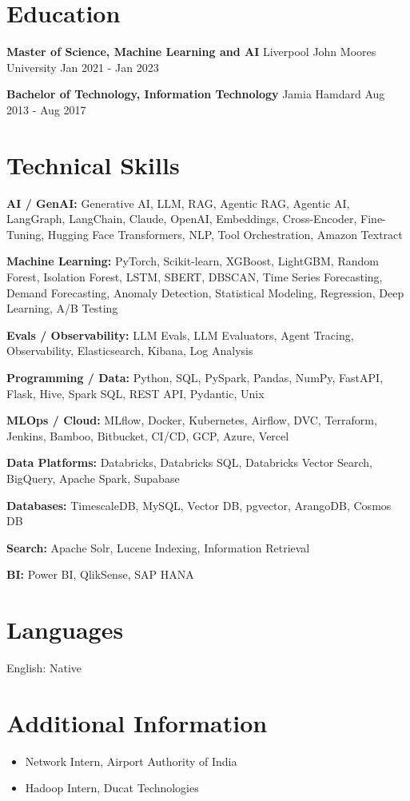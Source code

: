 \documentclass[10pt,a4paper]{article}
\begin{document}
\section{Education}
\textbf{Master of Science, Machine Learning and AI} \textbar{} Liverpool John Moores University \hfill Jan 2021 - Jan 2023\par
\textbf{Bachelor of Technology, Information Technology} \textbar{} Jamia Hamdard \hfill Aug 2013 - Aug 2017\par

\section{Technical Skills}
\textbf{AI / GenAI:} Generative AI, LLM, RAG, Agentic RAG, Agentic AI, LangGraph, LangChain, Claude, OpenAI, Embeddings, Cross-Encoder, Fine-Tuning, Hugging Face Transformers, NLP, Tool Orchestration, Amazon Textract\par
\textbf{Machine Learning:} PyTorch, Scikit-learn, XGBoost, LightGBM, Random Forest, Isolation Forest, LSTM, SBERT, DBSCAN, Time Series Forecasting, Demand Forecasting, Anomaly Detection, Statistical Modeling, Regression, Deep Learning, A/B Testing\par
\textbf{Evals / Observability:} LLM Evals, LLM Evaluators, Agent Tracing, Observability, Elasticsearch, Kibana, Log Analysis\par
\textbf{Programming / Data:} Python, SQL, PySpark, Pandas, NumPy, FastAPI, Flask, Hive, Spark SQL, REST API, Pydantic, Unix\par
\textbf{MLOps / Cloud:} MLflow, Docker, Kubernetes, Airflow, DVC, Terraform, Jenkins, Bamboo, Bitbucket, CI/CD, GCP, Azure, Vercel\par
\textbf{Data Platforms:} Databricks, Databricks SQL, Databricks Vector Search, BigQuery, Apache Spark, Supabase\par
\textbf{Databases:} TimescaleDB, MySQL, Vector DB, pgvector, ArangoDB, Cosmos DB\par
\textbf{Search:} Apache Solr, Lucene Indexing, Information Retrieval\par
\textbf{BI:} Power BI, QlikSense, SAP HANA\par

\section{Languages}
English: Native\par

\section{Additional Information}
\begin{itemize}
  \item Network Intern, Airport Authority of India
  \item Hadoop Intern, Ducat Technologies
\end{itemize}
\end{document}
